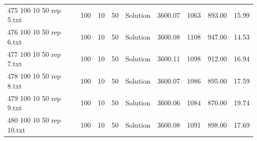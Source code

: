 \begin{longtable}{lrrllrrrr}
475 100 10 50 rep 5.txt & 100 & 10 & 50 & Solution & 3600.07 & 1063 & 893.00 & 15.99\\
476 100 10 50 rep 6.txt & 100 & 10 & 50 & Solution & 3600.08 & 1108 & 947.00 & 14.53\\
477 100 10 50 rep 7.txt & 100 & 10 & 50 & Solution & 3600.11 & 1098 & 912.00 & 16.94\\
478 100 10 50 rep 8.txt & 100 & 10 & 50 & Solution & 3600.07 & 1086 & 895.00 & 17.59\\
479 100 10 50 rep 9.txt & 100 & 10 & 50 & Solution & 3600.06 & 1084 & 870.00 & 19.74\\
480 100 10 50 rep 10.txt & 100 & 10 & 50 & Solution & 3600.08 & 1091 & 898.00 & 17.69\\
\end{longtable}

